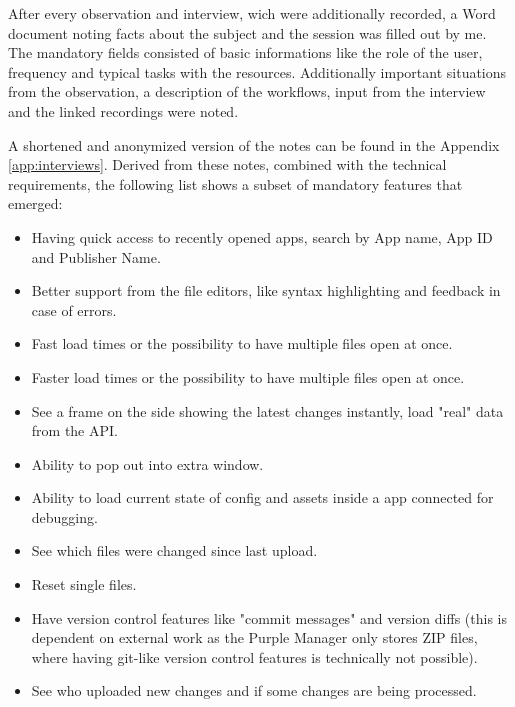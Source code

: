 After every observation and interview, wich were additionally recorded, a Word document noting facts about the subject and the session was filled out by me.
The mandatory fields consisted of basic informations like the role of the user, frequency and typical tasks with the resources.
Additionally important situations from the observation, a description of the workflows, input from the interview and the linked recordings were noted.

A shortened and anonymized version of the notes can be found in the Appendix \ref{app:interviews}.
Derived from these notes, combined with the technical requirements, the following list shows a subset of mandatory features that emerged:

\begin{description}[nosep]
  \item[App Selection] \leavevmode
  \begin{itemize}
    \item Having quick access to recently opened apps, search by App name, App ID and Publisher Name.
  \end{itemize}
  \item[App Editing] \leavevmode
  \begin{itemize}
    \item Better support from the file editors, like syntax highlighting and feedback in case of errors.
    \item Fast load times or the possibility to have multiple files open at once.
    \item Faster load times or the possibility to have multiple files open at once.
  \end{itemize}
  \item[App Preview]\leavevmode
   \begin{itemize}
    \item See a frame on the side showing the latest changes instantly, load "real" data from the API.
    \item Ability to pop out into extra window.
    \item Ability to load current state of config and assets inside a app connected for debugging.
  \end{itemize}
  \item[Dynamic Resource Change Management] \leavevmode
  \begin{itemize}
    \item See which files were changed since last upload.
    \item Reset single files.
    \item Have version control features like "commit messages" and version diffs (this is dependent on external work as the Purple Manager only stores ZIP files, where having git-like version control features is technically not possible).
    \item See who uploaded new changes and if some changes are being processed.
  \end{itemize}
\end{description}


